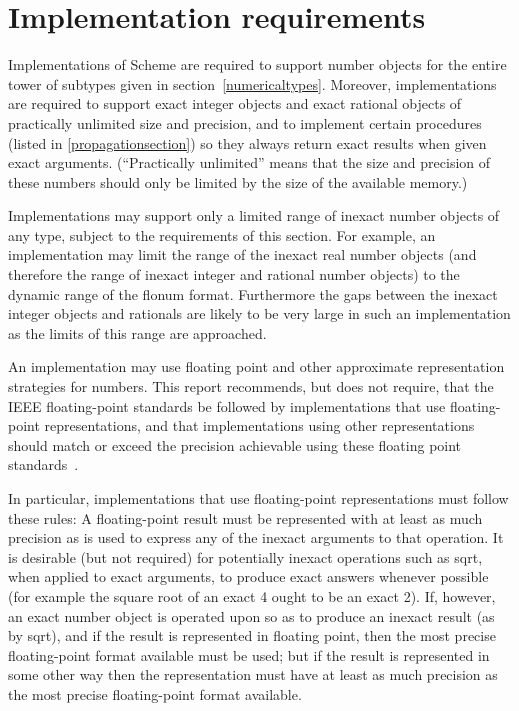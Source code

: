 \section{Implementation requirements}

\label{restrictions}

Implementations of Scheme are required to support number objects for
the entire tower of subtypes given in section~\ref{numericaltypes}.
Moreover, implementations are required to support exact integer 
objects and exact rational objects of practically unlimited
size and precision, and to implement certain procedures (listed in
\ref{propagationsection}) so they always return exact results when
given exact arguments.  (``Practically unlimited'' means that the size
and precision of these numbers should only be limited by the size of
the available memory.)

Implementations may support only a limited range of inexact number
objects of any type, subject to the requirements of this section.  For
example, an implementation may limit the range of the inexact real
number objects (and therefore the range of inexact integer and
rational number objects) to the dynamic range of the flonum format.
Furthermore the gaps between the inexact integer objects and
rationals are likely to be very large in such an implementation as the
limits of this range are approached.

An implementation may use floating point and other approximate 
representation strategies for  numbers.
This report recommends, but does not require, that the IEEE 
floating-point standards be followed by implementations that use
floating-point representations, and that implementations using
other representations should match or exceed the precision achievable
using these floating point standards~\cite{IEEE}.

In particular, implementations that use floating-point representations
must follow these rules: A floating-point result must be represented
with at least as much precision as is used to express any of the
inexact arguments to that operation.  It is desirable (but not
required) for potentially inexact operations such as {\cf sqrt}, when
applied to exact arguments, to produce exact answers whenever possible
(for example the square root of an exact 4 ought to be an exact 2).
If, however, an exact number object is operated upon so as to produce an
inexact result (as by {\cf sqrt}), and if the result is represented in
floating point, then the most precise floating-point format available
must be used; but if the result is represented in some other way then
the representation must have at least as much precision as the most
precise floating-point format available.

